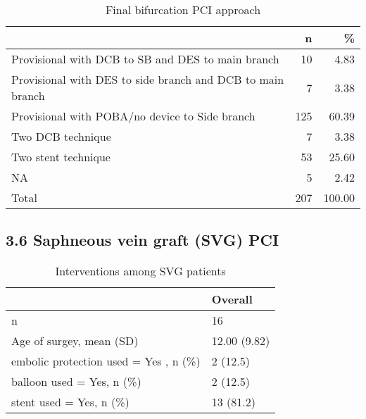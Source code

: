 \documentclass[
]{article}
\begin{document}
\begin{longtable}[t]{lrr}
\caption{\label{tab:table 40}Final bifurcation PCI approach}\\
\toprule
 & n & \%\\
\midrule
Provisional with DCB to SB and DES to main branch & 10 & 4.83\\
Provisional with DES to side branch and DCB to main branch & 7 & 3.38\\
Provisional with POBA/no device to Side branch & 125 & 60.39\\
Two DCB technique & 7 & 3.38\\
Two stent technique & 53 & 25.60\\
\addlinespace
NA & 5 & 2.42\\
Total & 207 & 100.00\\
\bottomrule
\end{longtable}
\clearpage

\hypertarget{saphneous-vein-graft-svg-pci}{%
\subsection{3.6 Saphneous vein graft (SVG)
PCI}\label{saphneous-vein-graft-svg-pci}}

\begin{longtable}[t]{ll}
\caption{\label{tab:table 41}Interventions among SVG patients}\\
\toprule
 & Overall\\
\midrule
n & 16\\
Age of surgey, mean (SD) & 12.00 (9.82)\\
embolic protection used = Yes , n (\%) & 2 (12.5)\\
balloon used = Yes, n (\%) & 2 (12.5)\\
stent used = Yes, n (\%) & 13 (81.2)\\
\bottomrule
\end{longtable}
\end{document}
